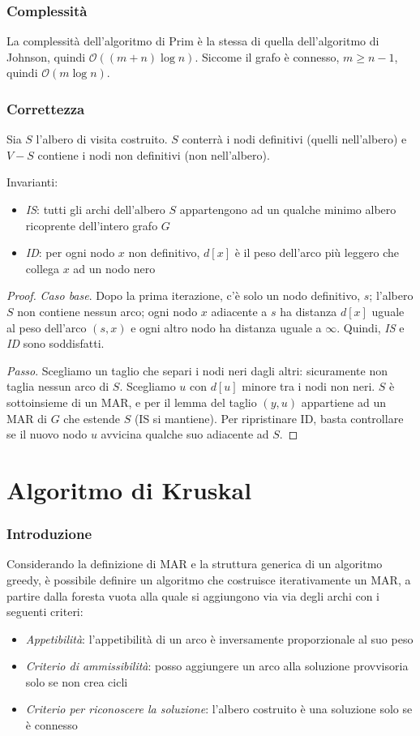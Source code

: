 \documentclass[11pt]{book}
\begin{document}
\subsubsection{Complessità}
La complessità dell'algoritmo di Prim è la stessa di quella dell'algoritmo di Johnson, quindi $\mathcal{O}((m+n)\log n)$. 
Siccome il grafo è connesso, $m\geq n-1$, quindi $\mathcal{O}(m\log n)$.
\subsubsection{Correttezza}
Sia $S$ l'albero di visita costruito. $S$ conterrà i nodi definitivi (quelli nell'albero) e $V-S$ contiene i nodi non 
definitivi (non nell'albero). 

Invarianti:
\begin{itemize}
    \item \textit{IS}: tutti gli archi dell'albero $S$ appartengono ad un qualche minimo albero ricoprente dell'intero 
    grafo $G$
    \item \textit{ID}: per ogni nodo $x$ non definitivo, $d[x]$ è il peso dell'arco più leggero che collega $x$ ad un nodo 
    nero 
\end{itemize}

\begin{proof}
    \textit{Caso base}. Dopo la prima iterazione, c'è solo un nodo definitivo, $s$; l'albero $S$ non contiene nessun arco; 
    ogni nodo $x$ adiacente a $s$ ha distanza $d[x]$ uguale al peso dell'arco $(s,x)$ e ogni altro nodo ha distanza uguale 
    a $\infty$. Quindi, \textit{IS} e \textit{ID} sono soddisfatti.

    \textit{Passo}. Scegliamo un taglio che separi i nodi neri dagli altri: sicuramente non taglia nessun arco di $S$.
    Scegliamo $u$ con $d[u]$ minore tra i nodi non neri. $S$ è sottoinsieme di un MAR, e per il lemma del taglio $(y,u)$ 
    appartiene ad un MAR di $G$ che estende $S$ (IS si mantiene). Per ripristinare ID, basta controllare se il nuovo nodo 
    $u$ avvicina qualche suo adiacente ad $S$.
\end{proof}
\section{Algoritmo di Kruskal}
\subsubsection{Introduzione}
Considerando la definizione di MAR e la struttura generica di un algoritmo greedy, è possibile definire un algoritmo che 
costruisce iterativamente un MAR, a partire dalla foresta vuota alla quale si aggiungono via via degli archi con i seguenti 
criteri:
\begin{itemize}
    \item \textit{Appetibilità}: l'appetibilità di un arco è inversamente proporzionale al suo peso 
    \item \textit{Criterio di ammissibilità}: posso aggiungere un arco alla soluzione provvisoria solo se non crea cicli 
    \item \textit{Criterio per riconoscere la soluzione}: l'albero costruito è una soluzione solo se è connesso 
\end{itemize}
\end{document}
